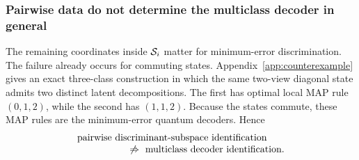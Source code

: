 \subsubsection{Pairwise data do not determine the multiclass decoder in general}

The remaining coordinates inside $\mathcal S_i$ matter for minimum-error discrimination.  The failure already occurs for commuting states.  Appendix~\ref{app:counterexample} gives an exact three-class construction in which the same two-view diagonal state admits two distinct latent decompositions.  The first has optimal local MAP rule $(0,1,2)$, while the second has $(1,1,2)$.  Because the states commute, these MAP rules are the minimum-error quantum decoders.  Hence
\begin{equation}
\begin{aligned}
&\text{pairwise discriminant-subspace identification}\\[-1mm]
&\hspace{18mm}\not\Rightarrow\ \text{multiclass decoder identification}.
\end{aligned}
\end{equation}

